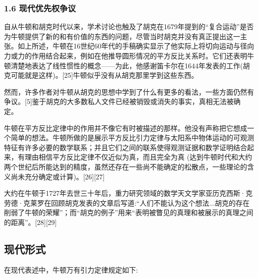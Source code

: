 \subsubsection{1.6 现代优先权争议}

自从牛顿和胡克时代以来，学术讨论也触及了胡克在1679年提到的“复合运动”是否为牛顿提供了新的和有价值的东西的问题，尽管当时胡克并没有真正提出这一主张。如上所述，牛顿在16世纪60年代的手稿确实显示了他实际上将切向运动与径向力或力的作用结合起来，例如在他推导圆形情况的平方反比关系时。它们还表明牛顿清楚地表达了线性惯性的概念——为此，他感谢笛卡尔在1644年发表的工作(胡克可能就是这样)。[25]牛顿似乎没有从胡克那里学到这些东西。

然而，许多作者对牛顿从胡克的思想中学到了什么有更多的看法，一些方面仍然有争议。[5]鉴于胡克的大多数私人文件已经被销毁或消失的事实，真相无法被确定。

牛顿在平方反比定律中的作用并不像它有时被描述的那样。他没有声称把它想成一个简单的想法。牛顿所做的是展示平方反比引力定律与太阳系中物体运动的可观测特征有许多必要的数学联系；并且它们之间的联系使得观测证据和数学证明结合起来，有理由相信平方反比定律不仅近似为真，而且完全为真 (达到牛顿时代和大约两个世纪后所能达到的精度，虽然还存在一些尚不能确定的松散点，一些理论的含义尚未充分确定或计算)。[26][27]

大约在牛顿于1727年去世三十年后，重力研究领域的数学天文学家亚历克西斯·克劳德·克莱罗在回顾胡克发表的文章后写道:“人们不能认为这个想法...胡克的存在削弱了牛顿的荣耀”；而“胡克的例子”用来“表明被瞥见的真理和被展示的真理之间的距离”。[28][29]

\subsection{现代形式}

在现代表述中，牛顿万有引力定律规定如下:

